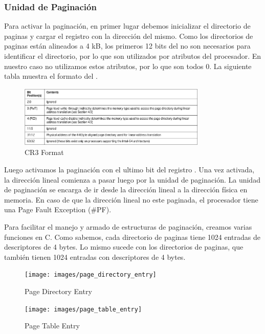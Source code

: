\subsubsection{Unidad de Paginación}

Para activar la paginación, en primer lugar debemos inicializar el directorio de paginas y cargar el registro  con la dirección del mismo. Como los directorios de paginas están alineados a 4 kB, los primeros 12 bits del  no son necesarios para identificar el directorio, por lo que son utilizados por atributos del procesador. En nuestro caso no utilizamos estos atributos, por lo que son todos 0. La siguiente tabla muestra el formato del .

\begin{figure}[H]
  \centering
    \includegraphics[width=0.8\textwidth]{images/cr3}
  \caption{CR3 Format}
\end{figure}

Luego activamos la paginación con el ultimo bit del registro . Una vez activada, la dirección lineal comienza a pasar luego por la unidad de paginación. La unidad de paginación se encarga de ir desde la dirección lineal a la dirección física en memoria. En caso de que la dirección lineal no este paginada, el procesador tiene una Page Fault Exception (\#PF).

Para facilitar el manejo y armado de estructuras de paginación, creamos varias funciones en C. Como sabemos, cada directorio de paginas tiene 1024 entradas de descriptores de 4 bytes. Lo mismo sucede con los directorios de paginas, que también tienen 1024 entradas con descriptores de 4 bytes.

\begin{figure}[H]
  \centering
    \texttt{[image: images/page\_directory\_entry]}
  \caption{Page Directory Entry}
\end{figure}

\begin{figure}[H]
  \centering
    \texttt{[image: images/page\_table\_entry]}
  \caption{Page Table Entry}
\end{figure}

